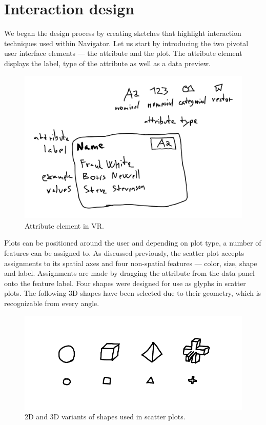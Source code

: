 \documentclass[thesis=M,english,hidelinks]{FITthesisXE}[2012/06/26]
\begin{document}
\section{Interaction design}

We began the design process by creating sketches that highlight interaction techniques used within Navigator. Let us start by introducing the two pivotal user interface elements --- the attribute and the plot. The attribute element displays the label, type of the attribute as well as a data preview.

\begin{figure}[ht]
\centering
\includegraphics[scale=0.7]{sketch_attribute}
\caption{Attribute element in VR.}
\label{fig:sketch_attribute}
\end{figure}

Plots can be positioned around the user and depending on plot type, a number of features can be assigned to. As discussed previously, the scatter plot accepts assignments to its spatial axes and four non-spatial features --- color, size, shape and label. Assignments are made by dragging the attribute from the data panel onto the feature label. Four shapes were designed for use as glyphs in scatter plots. The following 3D shapes have been selected due to their geometry, which is recognizable from every angle.

\begin{figure}[ht]
\centering
\includegraphics[scale=0.75]{sketch_shapes}
\caption{2D and 3D variants of shapes used in scatter plots.}
\label{fig:sketch_shapes}
\end{figure}
\end{document}
